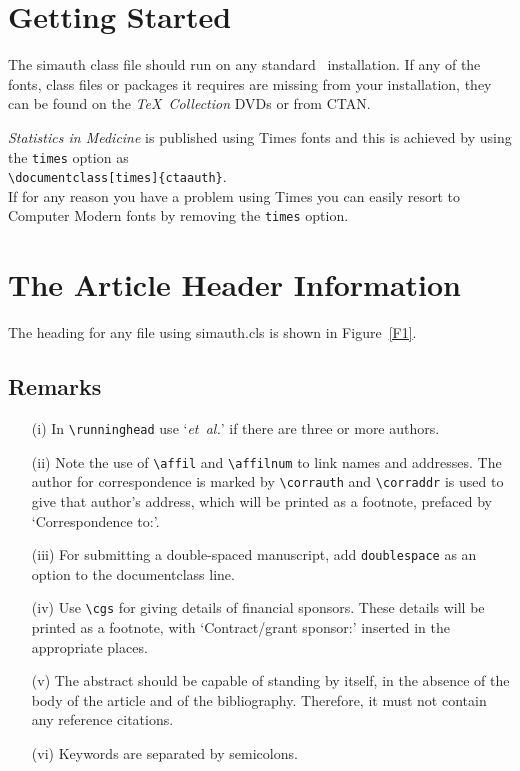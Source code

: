 \documentclass[times]{simauth}
\begin{document}
\section{Getting Started} The \textsf{simauth} class file should run
on any standard \LaTeXe\ installation. If any of the fonts, class
files or packages it requires are missing from your installation,
they can be found on the \emph{\TeX\ Collection} DVDs or from
CTAN.

\emph{Statistics in Medicine} is published using Times fonts and
this is achieved by using the \verb"times" option as\\
\verb"\documentclass[times]{ctaauth}".\\
If for any reason you have a problem using Times you can easily
resort to Computer Modern fonts by removing the \verb"times"
option.


\section{The Article Header Information}
The heading for any file using \textsf{simauth.cls} is shown in
Figure~\ref{F1}.

\subsection{Remarks}
\begin{enumerate}
\item[(i)] In \verb"\runninghead" use `\emph{et~al.}' if there are
three or more authors.

\item[(ii)] Note the use of \verb"\affil" and \verb"\affilnum" to
link names and addresses. The author for correspondence is marked
by \verb"\corrauth" and \verb"\corraddr" is used to give that
author's address, which will be printed as a footnote, prefaced by
`Correspondence to:'.

\item[(iii)] For submitting a double-spaced manuscript, add
\verb"doublespace" as an option to the documentclass line.

\item[(iv)] Use \verb"\cgs" for giving details of financial
sponsors. These details will be printed as a footnote, with
`Contract/grant sponsor:' inserted in the appropriate places.

\item[(v)] The abstract should be capable of standing by itself,
in the absence of the body of the article and of the bibliography.
Therefore, it must not contain any reference citations.

\item[(vi)] Keywords are separated by semicolons.
\end{enumerate}
\end{document}

